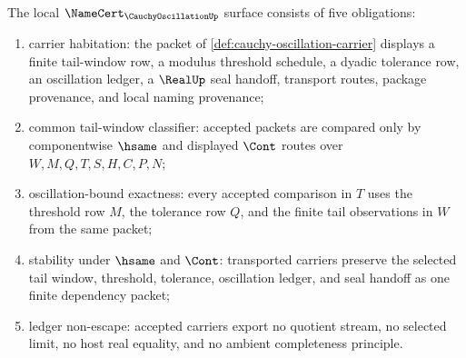 \begin{theorem}
\label{thm:cauchy-oscillation-namecert-obligations}
The local $\NameCert_{\CauchyOscillationUp}$ surface consists of five obligations:
\begin{enumerate}
\item carrier habitation: the packet of \autoref{def:cauchy-oscillation-carrier} displays a finite tail-window row, a modulus threshold schedule, a dyadic tolerance row, an oscillation ledger, a $\RealUp$ seal handoff, transport routes, package provenance, and local naming provenance;
\item common tail-window classifier: accepted packets are compared only by componentwise $\hsame$ and displayed $\Cont$ routes over $W,M,Q,T,S,H,C,P,N$;
\item oscillation-bound exactness: every accepted comparison in $T$ uses the threshold row $M$, the tolerance row $Q$, and the finite tail observations in $W$ from the same packet;
\item stability under $\hsame$ and $\Cont$: transported carriers preserve the selected tail window, threshold, tolerance, oscillation ledger, and seal handoff as one finite dependency packet;
\item ledger non-escape: accepted carriers export no quotient stream, no selected limit, no host real equality, and no ambient completeness principle.
\end{enumerate}
\end{theorem}

